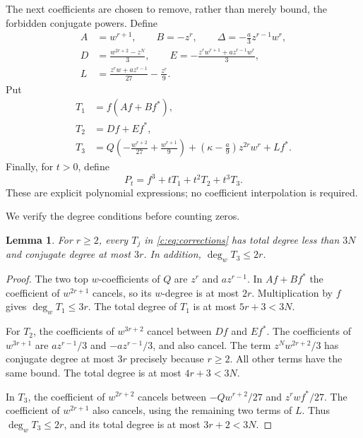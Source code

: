\documentclass[UTF8,11pt]{ctexart}
\newtheorem{lem}[thm]{Lemma}
\theoremstyle{definition}
\numberwithin{equation}{section}
\begin{document}
The next coefficients are chosen to remove, rather than merely bound,
the forbidden conjugate powers. Define
\begin{equation}\label{c:eq:auxiliary}
\begin{aligned}
 A&=w^{r+1},\qquad B=-z^r,\qquad
 \Delta=-\frac a3z^{r-1}w^r,\\
 D&=\frac{w^{2r+2}-z^N}{3},\qquad
 E=-\frac{z^r w^{r+1}+a z^{r-1}w^r}{3},\\
 L&=\frac{z^rw+a z^{r-1}}{27}-\frac{z^r}{9}.
\end{aligned}
\end{equation}
Put
\begin{equation}\label{c:eq:corrections}
\begin{split}
 T_1&=f(Af+Bf^*),\\
 T_2&=Df+Ef^*,\\
 T_3&=Q\left(-\frac{w^{r+2}}{27}+\frac{w^{r+1}}9\right)
       +\left(\kappa-\frac a9\right)z^{2r}w^r+Lf^*.
\end{split}
\end{equation}
Finally, for $t>0$, define
\begin{equation}\label{c:eq:family}
 P_t=f^3+tT_1+t^2T_2+t^3T_3.
\end{equation}
These are explicit polynomial expressions; no coefficient interpolation
is required.

We verify the degree conditions before counting zeros.
\begin{lem}\label{c:lem:degrees}
For $r\ge2$, every $T_j$ in \eqref{c:eq:corrections} has total degree
less than $3N$ and conjugate degree at most $3r$. In addition,
$\deg_w T_3\le2r$.
\end{lem}
\begin{proof}
The two top $w$-coefficients of $Q$ are $z^r$ and $a z^{r-1}$.
In $Af+Bf^*$ the coefficient of $w^{2r+1}$ cancels, so its
$w$-degree is at most $2r$. Multiplication by $f$ gives
$\deg_wT_1\le3r$. The total degree of $T_1$ is at most $5r+3<3N$.

For $T_2$, the coefficients of $w^{3r+2}$ cancel between $Df$ and
$Ef^*$. The coefficients of $w^{3r+1}$ are
$a z^{r-1}/3$ and $-a z^{r-1}/3$, and also cancel.
The term $z^Nw^{2r+2}/3$ has conjugate degree at most $3r$
precisely because $r\ge2$. All other terms have the same bound.
The total degree is at most $4r+3<3N$.

In $T_3$, the coefficient of $w^{2r+2}$ cancels between
$-Qw^{r+2}/27$ and $z^rwf^*/27$. The coefficient of $w^{2r+1}$
also cancels, using the remaining two terms of $L$.
Thus $\deg_wT_3\le2r$, and its total degree is at most $3r+2<3N$.
\end{proof}
\end{document}
